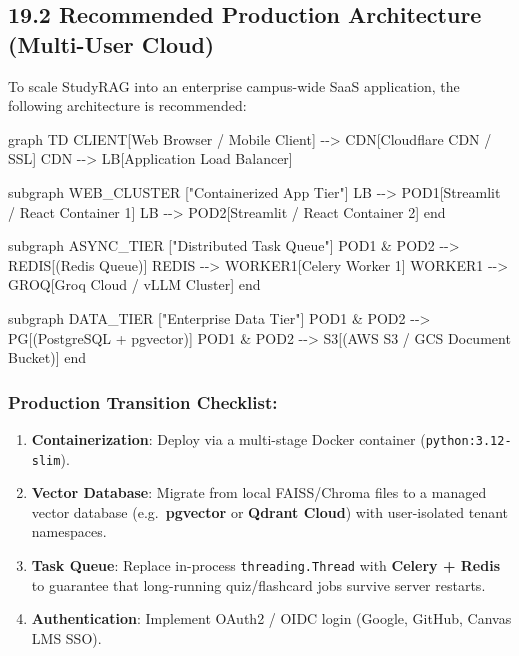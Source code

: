 \documentclass[
]{article}
\newenvironment{Shaded}{}{}
\newcommand{\NormalTok}[1]{#1}
\providecommand{\tightlist}{%
  \setlength{\itemsep}{0pt}\setlength{\parskip}{0pt}}
\begin{document}
\subsection{19.2 Recommended Production Architecture (Multi-User
Cloud)}\label{recommended-production-architecture-multi-user-cloud}

To scale StudyRAG into an enterprise campus-wide SaaS application, the
following architecture is recommended:

\begin{Shaded}
\begin{Highlighting}[]
\NormalTok{graph TD}
\NormalTok{    CLIENT[Web Browser / Mobile Client] {-}{-}\textgreater{} CDN[Cloudflare CDN / SSL]}
\NormalTok{    CDN {-}{-}\textgreater{} LB[Application Load Balancer]}
    
\NormalTok{    subgraph WEB\_CLUSTER ["Containerized App Tier"]}
\NormalTok{        LB {-}{-}\textgreater{} POD1[Streamlit / React Container 1]}
\NormalTok{        LB {-}{-}\textgreater{} POD2[Streamlit / React Container 2]}
\NormalTok{    end}
    
\NormalTok{    subgraph ASYNC\_TIER ["Distributed Task Queue"]}
\NormalTok{        POD1 \& POD2 {-}{-}\textgreater{} REDIS[(Redis Queue)]}
\NormalTok{        REDIS {-}{-}\textgreater{} WORKER1[Celery Worker 1]}
\NormalTok{        WORKER1 {-}{-}\textgreater{} GROQ[Groq Cloud / vLLM Cluster]}
\NormalTok{    end}
    
\NormalTok{    subgraph DATA\_TIER ["Enterprise Data Tier"]}
\NormalTok{        POD1 \& POD2 {-}{-}\textgreater{} PG[(PostgreSQL + pgvector)]}
\NormalTok{        POD1 \& POD2 {-}{-}\textgreater{} S3[(AWS S3 / GCS Document Bucket)]}
\NormalTok{    end}
\end{Highlighting}
\end{Shaded}

\subsubsection{Production Transition
Checklist:}\label{production-transition-checklist}

\begin{enumerate}
\def\labelenumi{\arabic{enumi}.}
\tightlist
\item
  \textbf{Containerization}: Deploy via a multi-stage Docker container
  (\texttt{python:3.12-slim}).
\item
  \textbf{Vector Database}: Migrate from local FAISS/Chroma files to a
  managed vector database (e.g.~\textbf{pgvector} or \textbf{Qdrant
  Cloud}) with user-isolated tenant namespaces.
\item
  \textbf{Task Queue}: Replace in-process \texttt{threading.\allowbreak Thread} with
  \textbf{Celery + Redis} to guarantee that long-running quiz/flashcard
  jobs survive server restarts.
\item
  \textbf{Authentication}: Implement OAuth2 / OIDC login (Google,
  GitHub, Canvas LMS SSO).
\end{enumerate}
\end{document}
